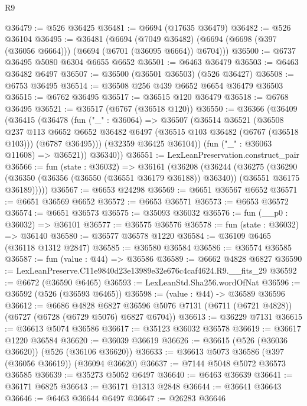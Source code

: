 \begin{lexlean}{R9}
\begin{coremodule}
@36479 := @526 @36425
@36481 := @6694 (@17635 @36479)
@36482 := @526 @36104
@36495 := @36481
    (@6694
      (@7049 @36482)
      (@6694 (@6698 (@397 (@36056 @6664))) (@6694 (@6701 (@36095 @6664)) @6704)))
@36500 := @6737 @36495 @5080 @6304 @6655 @6652
@36501 := @6463 @36479
@36503 := @6463 @36482 @6497
@36507 := @36500 (@36501 @36503) (@526 @36427)
@36508 := @6753 @36495
@36514 := @36508 @256 @439 @6652 @6654 @36479 @36503
@36515 := @6762 @36495
@36517 := @36515 @120 @36479
@36518 := @6768 @36495
@36521 := @36517 (@6767 (@36518 @120))
@36550 := @36366
    (@36409
      (@36415
        (@36478
          (fun ("_" : @36064) =>
          @36507
            (@36514
              @36521
              (@36508
                @237
                @113
                @6652
                @6652
                @36482
                @6497
                (@36515 @103 @36482 (@6767 (@36518 @103)))
                (@6787 @36495)))
            (@32359 @36425 @36104))
          (fun ("_" : @36063 @11608) => @36521))
        @36340))
@36551 := LexLeanPreservation.construct_pair
@36566 := fun (state : @36032) =>
  @36161
    (@36208
      (@36244
        (@36275
          (@36290
            (@36350 (@36356 (@36550 (@36551 @36179 @36188)) @36340))
            (@36551 @36175 @36189)))))
@36567 := @6653 @24298
@36569 := @6651 @36567 @6652
@36571 := @6651 @36569 @6652
@36572 := @6653 @36571
@36573 := @6653 @36572
@36574 := @6651 @36573
@36575 := @35093 @36032
@36576 := fun (__p0 : @36032) => @36101
@36577 := @36575 @36576
@36578 := fun (state : @36032) => @36140
@36580 := @36577 @36578 @1220
@36584 := @36109 @6465 (@36118 @1312 @2847)
@36585 := @36580 @36584
@36586 := @36574 @36585
@36587 := fun (value : @44) => @36586
@36589 := @6662 @4828 @6827
@36590 := LexLeanPreserve.C11e9840d23e13989e32e676c4caf4624.R9.__fits_29
@36592 := @6672 (@36590 @6465)
@36593 := LexLeanStd.Sha256.wordOfNat
@36596 := @36592 (@526 (@36593 @6465))
@36598 := (value : @44) -> @36589 @36596
@36612 := @6686
    @4828
    @6827
    @36596
    @5076
    @7131
    (@6711 (@6721 @4828))
    (@6727 (@6728 (@6729 @5076) @6827 @6704))
@36613 := @36229 @7131
@36615 := @36613 @5074 @36586
@36617 := @35123 @36032 @36578
@36619 := @36617 @1220 @36584
@36620 := @36039 @36619
@36626 := @36615 (@526 (@36036 @36620)) (@526 (@36106 @36620))
@36633 := @36613 @5073 @36586 (@397 (@36056 @36619)) (@36094 @36620)
@36637 := @7144 @5048 @5072 @36573 @36585
@36639 := @35273 @5052 @6497
@36640 := @6463 @36639
@36641 := @36171 @6825
@36643 := @36171 @1313 @2848
@36644 := @36641 @36643
@36646 := @6463 @36644 @6497
@36647 := @26283 @36646

\end{coremodule}
\end{lexlean}
